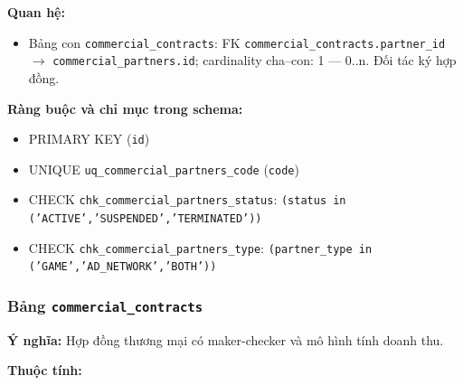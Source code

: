 \textbf{Quan hệ:}

\begin{itemize}

\item Bảng con \texttt{commercial\_contracts}: FK \texttt{commercial\_contracts.partner\_id} $\rightarrow$ \texttt{commercial\_partners.id}; cardinality cha--con: 1 — 0..n. Đối tác ký hợp đồng.

\end{itemize}

\textbf{Ràng buộc và chỉ mục trong schema:}

\begin{itemize}

\item PRIMARY KEY (\texttt{id})

\item UNIQUE \texttt{uq\_commercial\_partners\_code} (\texttt{code})

\item CHECK \texttt{chk\_commercial\_partners\_status}: \texttt{(status in ('ACTIVE','SUSPENDED','TERMINATED'))}

\item CHECK \texttt{chk\_commercial\_partners\_type}: \texttt{(partner\_type in ('GAME','AD\_NETWORK','BOTH'))}

\end{itemize}

\subsubsection{Bảng \texttt{commercial\_contracts}}

\textbf{Ý nghĩa:} Hợp đồng thương mại có maker-checker và mô hình tính doanh thu.\par

\textbf{Thuộc tính:}


